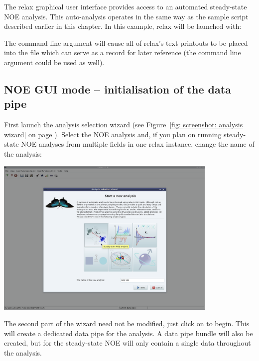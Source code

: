 The relax graphical user interface provides access to an automated steady-state NOE analysis.
This auto-analysis operates in the same way as the sample script described earlier in this chapter.
In this example, relax will be launched with:


The  command line argument will cause all of relax's text printouts to be placed into the  file which can serve as a record for later reference (the  command line argument could be used as well).



\subsection{NOE GUI mode -- initialisation of the data pipe}

First launch the analysis selection wizard (see Figure~\ref{fig: screenshot: analysis wizard} on page \pageref{fig: screenshot: analysis wizard}).
Select the NOE analysis and, if you plan on running steady-state NOE analyses from multiple fields in one relax instance, change the name of the analysis:

\begin{minipage}[h]{\linewidth}
\centerline{\includegraphics[width=0.8\textwidth, bb=14 14 1415 1019]{graphics/screenshots/noe_analysis/analysis_wizard1}}
\end{minipage}

The second part of the wizard need not be modified, just click on  to begin.
This will create a dedicated data pipe for the analysis.
A data pipe bundle will also be created, but for the steady-state NOE will only contain a single data throughout the analysis.

